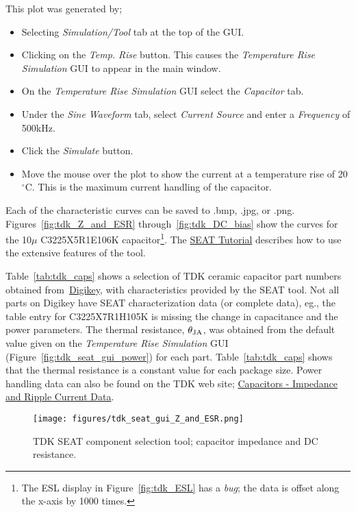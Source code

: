 \documentclass[10pt,twoside]{article}
\begin{document}
\begin{itemize}
This plot was generated by;
\begin{itemize}
\item Selecting {\em Simulation/Tool} tab at the top of the GUI.
\item Clicking on the {\em Temp. Rise} button. This causes the 
{\em Temperature Rise Simulation} GUI to appear in the main window.
\item On the {\em Temperature Rise Simulation} GUI select the {\em Capacitor}
tab.
\item Under the {\em Sine Waveform} tab, select {\em Current Source}
and enter a {\em Frequency} of 500kHz. 
\item Click the {\em Simulate} button.
\item Move the mouse over the plot to show the current at a temperature
rise of 20$^\circ$C. This is the maximum current handling of the capacitor.
\end{itemize}
%
\end{itemize}
%
Each of the characteristic curves can be saved to .bmp, .jpg, or .png.
Figures~\ref{fig:tdk_Z_and_ESR} through~\ref{fig:tdk_DC_bias} show the
curves for the 10$\mu$ C3225X5R1E106K capacitor\footnote{
The ESL display in Figure~\ref{fig:tdk_ESL} has a {\em bug}; 
the data is offset along the x-axis by 1000 times.}.
%
The 
\href{http://www.tdk.com/pdf/etutorial_all.pdf}{SEAT Tutorial}
describes how to use the extensive features of the tool.

\clearpage
Table~\ref{tab:tdk_caps} shows a selection of TDK
ceramic capacitor part numbers obtained 
from~\href{http://www.digikey.com}{Digikey}, with
characteristics provided by the SEAT tool. 
%
Not all parts on Digikey have SEAT characterization data
(or complete data), eg., the table entry for C3225X7R1H105K
is missing the change in capacitance and the power parameters.
%
The thermal resistance, $\theta_{\rm JA}$, was obtained from the
default value given on the {\em Temperature Rise Simulation} GUI
(Figure~\ref{fig:tdk_seat_gui_power}) for each part. 
Table~\ref{tab:tdk_caps} shows that the thermal resistance is a 
constant value for each package size.
Power handling data can also be found on the TDK web site;
\href{http://www.tdk.com/tvcl_ircd.php}{Capacitors - Impedance and Ripple Current Data}.

%
\begin{landscape}
\begin{figure}[p]
  \begin{center}
    \texttt{[image: figures/tdk\_seat\_gui\_Z\_and\_ESR.png]}\\
  \end{center}
  \caption{TDK SEAT component selection tool; capacitor impedance and DC resistance.}
  \label{fig:tdk_seat_gui_Z_and_ESR}
\end{figure}
\end{landscape}
\end{document}
